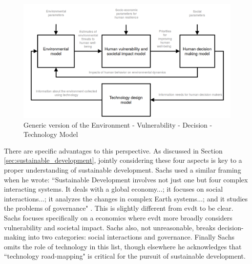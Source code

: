 \begin{figure}[h]
    \centering
    \includegraphics[scale=0.3]{Figures/chap3/modelflow.png}
    \caption[Generic version of EVDT Model] {Generic version of the Environment - Vulnerability - Decision - Technology Model}
    \label{fig:model}
\end{figure}

There are specific advantages to this perspective. As discussed in Section \ref{sec:sustainable_development}, jointly considering these four aspects is key to a proper understanding of sustainable development. Sachs used a similar framing when he wrote: ``Sustainable Development involves not just one but four complex interacting systems. It deals with a global economy...; it focuses on social interactions...; it analyzes the changes in complex Earth systems...; and it studies the problems of governance" \cite{sachsAgeSustainableDevelopment2015}. This is slightly different from \ac{evdt} to be clear. Sachs focuses specifically on a economics where \ac{evdt} more broadly considers vulnerability and societal impact. Sachs also, not unreasonable, breaks decision-making into two categories: social interactions and governance. Finally Sachs omits the role of technology in this list, though elsewhere he acknowledges that ``technology road-mapping" is critical for the pursuit of sustainable development.

